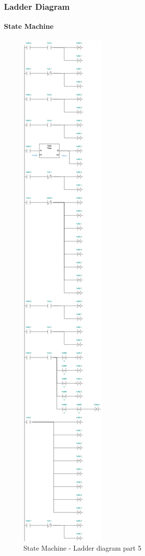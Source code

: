 \documentclass[12pt]{beamer}
\begin{document}
\begin{frame}
\frametitle{Ladder Diagram}
\framesubtitle{State Machine}
\begin{figure}
    \centering
    \includegraphics[trim={0 54cm 0 44cm}, clip, scale=.5]{img/Ladder_diagram_2.jpg}
    \caption{State Machine - Ladder diagram part 5}
    \label{fig:ladder25}
\end{figure}
\end{frame}
\end{document}
